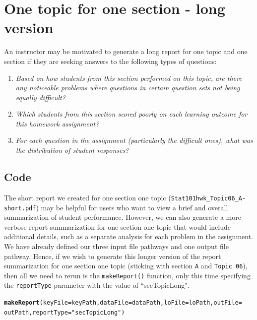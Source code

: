 \documentclass[11pt,a4paper,oldfontcommands,openany]{memoir}
\makeatletter
\newcommand{\hlstr}[1]{\textcolor[rgb]{0.192,0.494,0.8}{#1}}%
\newcommand{\hlstd}[1]{\textcolor[rgb]{0.345,0.345,0.345}{#1}}%
\newcommand{\hlkwc}[1]{\textcolor[rgb]{0.333,0.667,0.333}{#1}}%
\newcommand{\hlkwd}[1]{\textcolor[rgb]{0.737,0.353,0.396}{\textbf{#1}}}%
\newenvironment{kframe}{%
 \def\at@end@of@kframe{}%
 \ifinner\ifhmode%
  \def\at@end@of@kframe{\end{minipage}}%
  \begin{minipage}{\columnwidth}%
 \fi\fi%
 \def\FrameCommand##1{\hskip\@totalleftmargin \hskip-\fboxsep
 \colorbox{shadecolor}{##1}\hskip-\fboxsep
     \hskip-\linewidth \hskip-\@totalleftmargin \hskip\columnwidth}%
 \MakeFramed {\advance\hsize-\width
   \@totalleftmargin\z@ \linewidth\hsize
   \@setminipage}}%
 {\par\unskip\endMakeFramed%
 \at@end@of@kframe}
\newenvironment{knitrout}{}{} %
\numberwithin{equation}{section} %
\makeatother
\begin{document}
\section{One topic for one section - long version}

An instructor may be motivated to generate a long report for one topic and one section if they are seeking answers to the following types of questions:

\begin{enumerate}
\item \textit{Based on how students from this section performed on this topic, are there any noticeable problems where questions in certain question sets not being equally difficult?}
\item \textit{Which students from this section scored poorly on each learning outcome for this homework assignment?}
\item \textit{For each question in the assignment (particularly the difficult ones), what was the distribution of student responses?}
\end{enumerate}

\subsection{Code}

The short report we created for one section one topic (\texttt{Stat101hwk\_Topic06\_A-short.pdf}) may be helpful for users who want to view a brief and overall summarization of student performance. However, we can also generate a more verbose report summarization for one section one topic that would include additional details, such as a separate analysis for each problem in the assignment. We have already defined our three input file pathways and one output file pathway. Hence, if we wish to generate this longer version of the report summarization for one section one topic (sticking with section \texttt{A} and \texttt{Topic 06}), then all we need to rerun is the \texttt{makeReport()} function, only this time specifying the \texttt{reportType} parameter with the value of ``secTopicLong". \\

\begin{knitrout}
\color{fgcolor}\begin{kframe}
\begin{alltt}
\hlkwd{makeReport}\hlstd{(}\hlkwc{keyFile} \hlstd{= keyPath,} \hlkwc{dataFile} \hlstd{= dataPath,} \hlkwc{loFile} \hlstd{= loPath,} \hlkwc{outFile} \hlstd{=}
  \hlstd{outPath,} \hlkwc{reportType} \hlstd{=} \hlstr{"secTopicLong"}\hlstd{)}
\end{alltt}
\end{kframe}
\end{knitrout}
\end{document}
